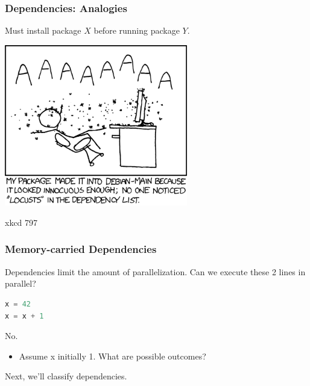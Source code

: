 \begin{frame}
\frametitle{Dependencies: Analogies}

Must install package $X$ before running package $Y$.

\begin{center}
	\includegraphics[width=0.6\textwidth]{images/debian_main.png}
\end{center}
\hfill xkcd 797
	

\end{frame}

\begin{frame}[fragile]
\frametitle{Memory-carried Dependencies}

Dependencies limit the amount of parallelization.
\vfill
Can we execute these 2 lines in parallel?
\begin{lstlisting}[language=C]
x = 42
x = x + 1  
\end{lstlisting}
\pause
\alert{No.}\\[1em]
\begin{itemize}
\item Assume x initially 1. What are possible outcomes?
\pause \newline {}\\[1em]

\end{itemize}

Next, we'll classify dependencies.



\end{frame}





